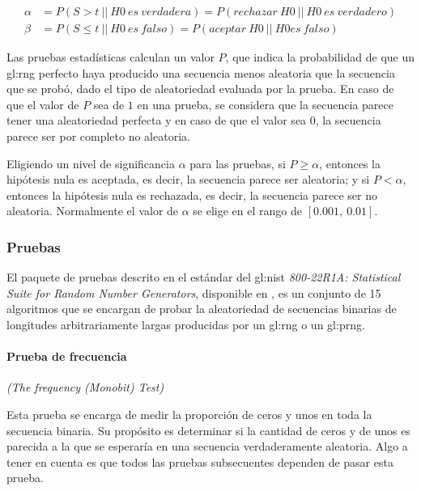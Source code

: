 \begin{align}
  \alpha &= P(S > t\: ||\: H0\: es\: verdadera)
          = P(rechazar\: H0\: ||\: H0\: es\: verdadero)\\
  \beta  &= P(S \leq t\: ||\: H0\: es\: falso)
          = P(aceptar\: H0\: ||\: H0 es\: falso)
\end{align}

Las pruebas estadísticas calculan un valor $P$, que indica la probabilidad de
que un \gls{gl:rng} perfecto haya producido una secuencia menos aleatoria que
la secuencia que se probó, dado el tipo de aleatoriedad evaluada por la prueba.
En caso de que el valor de $P$ sea de $1$ en una prueba, se considera que la
secuencia parece tener una aleatoriedad perfecta y en caso de que el valor
sea $0$, la secuencia parece ser por completo no aleatoria.

Eligiendo un nivel de significancia $\alpha$ para las pruebas, si $P \geq
\alpha$, entonces la hipótesis nula es aceptada, es decir, la secuencia
parece ser aleatoria; y si $P < \alpha$, entonces la hipótesis nula es
rechazada, es decir, la secuencia parece ser no aleatoria. Normalmente
el valor de $\alpha$ se elige en el rango de $[0.001,\: 0.01]$.

\subsubsection{Pruebas} %
\label{sec:lista_pruebas}

El paquete de pruebas descrito en el estándar del \gls{gl:nist}
\textit{800-22R1A: Statistical Suite for Random Number Generators}, disponible
en \cite{nist_pruebas}, es un conjunto de 15 algoritmos que se encargan de
probar la aleatoriedad de secuencias binarias de longitudes arbitrariamente
largas producidas por un \gls{gl:rng} o un \gls{gl:prng}.

\paragraph{Prueba de frecuencia} %
\textit{(The frequency (Monobit) Test)}

Esta prueba se encarga de medir la proporción de ceros y unos en toda la
secuencia binaria. Su propósito es determinar si la cantidad de ceros y de
unos es parecida a la que se esperaría en una secuencia verdaderamente
aleatoria. Algo a tener en cuenta es que todos las pruebas subsecuentes
dependen de pasar esta prueba.

